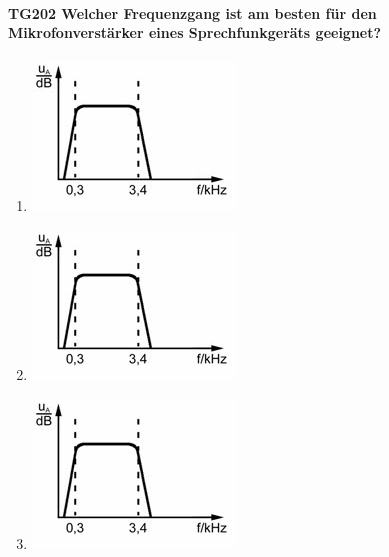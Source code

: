 \documentclass[8pt]{article}
\begin{document}
\paragraph*{TG202 Welcher Frequenzgang ist am besten für den Mikrofonverstärker eines Sprechfunkgeräts geeignet?}
\begin{enumerate}[nolistsep,label=\Alph*]
\item
\begin{center}
	\begin{minipage}{\linewidth}
		\centering
		\includegraphics[scale=1.0]{pics/tg202_a.jpg}
	\end{minipage}
\end{center}
\item
\begin{center}
	\begin{minipage}{\linewidth}
		\centering
		\includegraphics[scale=1.0]{pics/tg202_a.jpg}
	\end{minipage}
\end{center}
\item
\begin{center}
	\begin{minipage}{\linewidth}
		\centering
		\includegraphics[scale=1.0]{pics/tg202_a.jpg}
	\end{minipage}
\end{center}

\end{enumerate}
\end{document}

